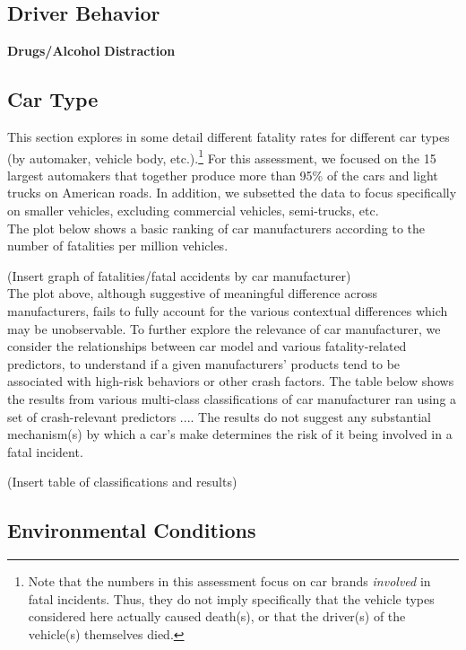 \documentclass[11pt, oneside]{article}   	%
\begin{document}
\subsection*{Driver Behavior}
\textbf{Drugs/Alcohol}
\textbf{Distraction}

\subsection*{Car Type}

This section explores in some detail different fatality rates for different car types (by automaker, vehicle body, etc.).\footnote{Note that the numbers in this assessment focus on car brands \textit{involved} in fatal incidents. Thus, they do not imply specifically that the vehicle types considered here actually caused death(s), or that the driver(s) of the vehicle(s) themselves died.} For this assessment, we focused on the 15 largest automakers that together produce more than 95\% of the cars and light trucks on American roads. In addition, we subsetted the data to focus specifically on smaller vehicles, excluding commercial vehicles, semi-trucks, etc. \\

The plot below shows a basic ranking of car manufacturers according to the number of fatalities per million vehicles.

(Insert graph of fatalities/fatal accidents by car manufacturer) \\

The plot above, although suggestive of meaningful difference across manufacturers, fails to fully account for the various contextual differences which may be unobservable. To further explore the relevance of car manufacturer, we consider the relationships between car model and various fatality-related predictors, to understand if a given manufacturers' products tend to be associated with high-risk behaviors or other crash factors. The table below shows the results from various multi-class classifications of car manufacturer ran using a set of crash-relevant predictors .... The results do not suggest any substantial mechanism(s) by which a car's make determines the risk of it being involved in a fatal incident. 

(Insert table of classifications and results)

\subsection*{Environmental Conditions}
\end{document}
